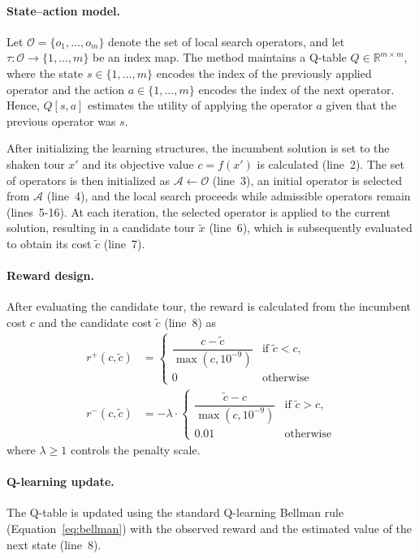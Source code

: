 \documentclass[runningheads]{llncs}
\begin{document}
\paragraph{State--action model.}
Let $\mathcal{O}=\{o_1,\dots,o_m\}$ denote the set of local search operators, and let $\tau:\mathcal{O}\rightarrow\{1,\dots,m\}$ be an index map. The method maintains a Q-table $Q \in \mathbb{R}^{m\times m}$, where the state $s \in \{1,\dots,m\}$ encodes the index of the previously applied operator and the action $a \in \{1,\dots,m\}$ encodes the index of the next operator. Hence, $Q[s,a]$ estimates the utility of applying the operator $a$ given that the previous operator was $s$.

After initializing the learning structures, the incumbent solution is set to the shaken tour $x'$ and its objective value $c = f(x')$ is calculated (line~2). The set of operators is then initialized as $\mathcal{A} \gets \mathcal{O}$ (line~3), an initial operator is selected from $\mathcal{A}$ (line~4), and the local search proceeds while admissible operators remain (lines~5-16). At each iteration, the selected operator is applied to the current solution, resulting in a candidate tour $\tilde{x}$ (line~6), which is subsequently evaluated to obtain its cost $\tilde{c}$ (line~7).

\paragraph{Reward design.}
After evaluating the candidate tour, the reward is calculated from the incumbent cost $c$ and the candidate cost $\tilde{c}$ (line~8) as
\begin{equation}
\label{eq:reward}
\begin{aligned}
r^+(c,\tilde{c}) &=
\begin{cases}
\dfrac{c-\tilde{c}}{\max(c,10^{-9})} & \text{if } \tilde{c} < c,\\
0 & \text{otherwise}
\end{cases}
\\[0.8ex]
r^-(c,\tilde{c}) &=
-\lambda\cdot
\begin{cases}
\dfrac{\tilde{c}-c}{\max(c,10^{-9})} & \text{if } \tilde{c} > c,\\
0.01 & \text{otherwise}
\end{cases}
\end{aligned}
\end{equation}
where $\lambda \ge 1$ controls the penalty scale.

\paragraph{Q-learning update.}
The Q-table is updated using the standard Q-learning Bellman rule (Equation~\ref{eq:bellman}) with the observed reward and the estimated value of the next state (line~8).
\end{document}
